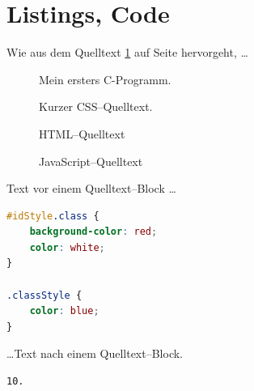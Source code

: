\section*{Listings, Code}
Wie aus dem Quelltext \ref{code01} auf Seite \pageref{code01} hervorgeht, \ldots


\begin{figure}[H]
	
	\caption{Mein ersters C-Programm.}
  	\label{code01}
\end{figure}


\begin{figure}[H]
	
	\caption{Kurzer CSS--Quelltext.}
  	\label{code02}
\end{figure}

\begin{figure}[H]
	
	\caption{HTML--Quelltext}
  	\label{code03}
\end{figure}


\begin{figure}[H]
	
	\caption{JavaScript--Quelltext}
  	\label{code04}
\end{figure}

Text vor einem Quelltext--Block \ldots

\begin{lstlisting}[language=CSS]
#idStyle.class {
	background-color: red;
	color: white;
}

.classStyle {
	color: blue;
}
\end{lstlisting}

\ldots Text nach einem Quelltext--Block.


\begin{lstlisting}[language=TypoScript]
10.
\end{lstlisting}

